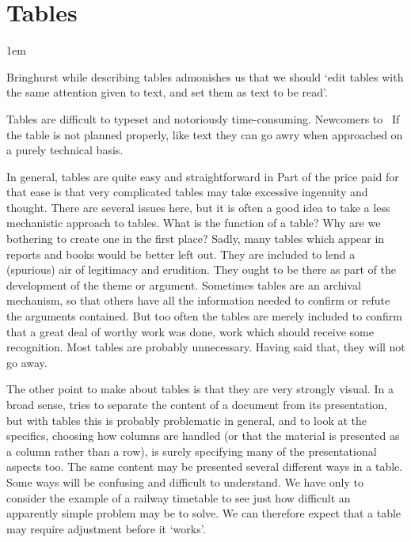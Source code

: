 \chapter{Tables}
\parindent1em
\label{ch:tables}

Bringhurst \cite{Bringhurst2005} while describing tables admonishes us that we should  `edit tables with the same attention given to text, and set them as text to be read'.

Tables are difficult to typeset and notoriously time-consuming. Newcomers to \latex\
If the table is not planned properly, like text they can go awry when approached on a
purely technical basis.

In general, tables are quite easy and straightforward in \latex 
Part of the price paid for that ease is that very complicated
tables may take excessive ingenuity and thought. There
are several issues here, but it is often a good idea to take a less
mechanistic approach to tables. What is the function of a table?
Why are we bothering to create one in the first place?
Sadly, many tables which appear in reports and books would
be better left out. They are included to lend a (spurious) air
of legitimacy and erudition. They ought to be there as part
of the development of the theme or argument. Sometimes
tables are an archival mechanism, so that others have all the
information needed to confirm or refute the arguments contained.
But too often the tables are merely included to confirm
that a great deal of worthy work was done, work which
should receive some recognition. Most tables are probably
unnecessary. Having said that, they will not go away.

The other point to make about tables is that they are very
strongly visual. In a broad sense, \latex tries to separate the
content of a document from its presentation, but with tables
this is probably problematic in general, and to look at the
specifics, choosing how columns are handled (or that the material
is presented as a column rather than a row), is surely
specifying many of the presentational aspects too. The same
content may be presented several different ways in a table.
Some ways will be confusing and difficult to understand. We
have only to consider the example of a railway timetable to
see just how difficult an apparently simple problem may be
to solve. We can therefore expect that a table may require
adjustment before it `works'.

